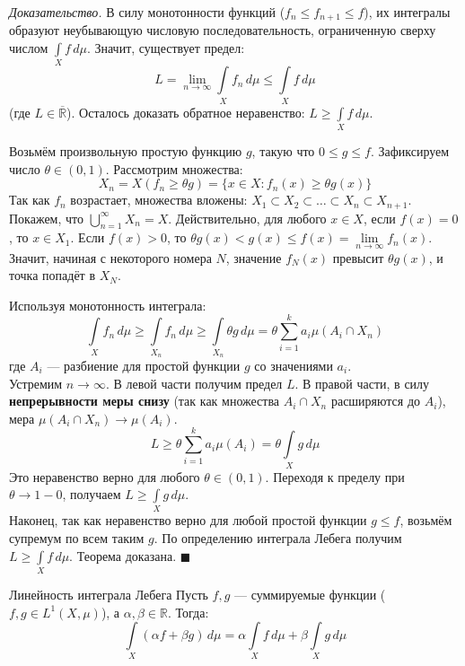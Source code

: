 \documentclass[12pt,a4paper]{article}
\newenvironment{Proof}[1][Доказательство]{\vspace{0.5em}\noindent\textit{#1.}\hspace{0.5em}\ignorespaces}{\hfill$\blacksquare$\vspace{1em}}
\begin{document}
\begin{Proof}
В силу монотонности функций ($f_n \le f_{n+1} \le f$), их интегралы образуют неубывающую числовую последовательность, ограниченную сверху числом $\int\limits_X f \, d\mu$. Значит, существует предел:
$$ L = \lim\limits_{n \to \infty} \int\limits_X f_n \, d\mu \le \int\limits_X f \, d\mu $$
(где $L \in \overline{\mathbb{R}}$). Осталось доказать обратное неравенство: $L \ge \int\limits_X f \, d\mu$.

Возьмём произвольную простую функцию $g$, такую что $0 \le g \le f$. 
Зафиксируем число $\theta \in (0, 1)$. Рассмотрим множества:
$$ X_n = X(f_n \ge \theta g) = \{ x \in X : f_n(x) \ge \theta g(x) \} $$
Так как $f_n$ возрастает, множества вложены: $X_1 \subset X_2 \subset \dots \subset X_n \subset X_{n+1}$. \\
Покажем, что $\bigcup\limits_{n=1}^{\infty} X_n = X$. Действительно, для любого $x \in X$, если $f(x) = 0$, то $x \in X_1$. Если $f(x) > 0$, то $\theta g(x) < g(x) \le f(x) = \lim\limits_{n \to \infty} f_n(x)$. Значит, начиная с некоторого номера $N$, значение $f_N(x)$ превысит $\theta g(x)$, и точка попадёт в $X_N$.

Используя монотонность интеграла:
$$ \int\limits_X f_n \, d\mu \ge \int\limits_{X_n} f_n \, d\mu \ge \int\limits_{X_n} \theta g \, d\mu = \theta \sum\limits_{i=1}^k a_i \mu(A_i \cap X_n) $$
где $A_i$ — разбиение для простой функции $g$ со значениями $a_i$. \\
Устремим $n \to \infty$. В левой части получим предел $L$. В правой части, в силу \textbf{непрерывности меры снизу} (так как множества $A_i \cap X_n$ расширяются до $A_i$), мера $\mu(A_i \cap X_n) \to \mu(A_i)$.
$$ L \ge \theta \sum\limits_{i=1}^k a_i \mu(A_i) = \theta \int\limits_X g \, d\mu $$
Это неравенство верно для любого $\theta \in (0, 1)$. Переходя к пределу при $\theta \to 1-0$, получаем $L \ge \int\limits_X g \, d\mu$. \\
Наконец, так как неравенство верно для любой простой функции $g \le f$, возьмём супремум по всем таким $g$. По определению интеграла Лебега получим $L \ge \int\limits_X f \, d\mu$. Теорема доказана.
\end{Proof}

\begin{Theorem}{Линейность интеграла Лебега}{}
Пусть $f, g$ — суммируемые функции ($f, g \in L^1(X, \mu)$), а $\alpha, \beta \in \mathbb{R}$. Тогда:
$$ \int\limits_X (\alpha f + \beta g) \, d\mu = \alpha \int\limits_X f \, d\mu + \beta \int\limits_X g \, d\mu $$
\end{Theorem}
\end{document}
